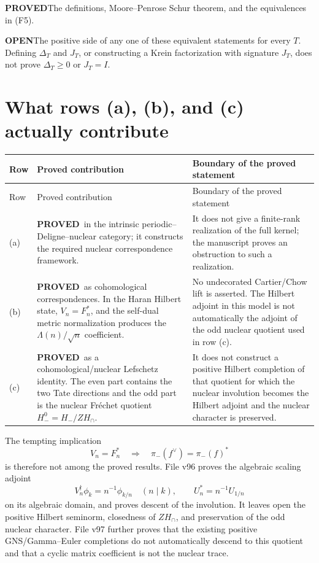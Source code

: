 \documentclass[11pt]{article}
\newcommand{\PROVED}{\textcolor{green!45!black}{\textbf{PROVED}}}
\newcommand{\OPEN}{\textcolor{red!70!black}{\textbf{OPEN}}}
\begin{document}
\medskip
\noindent\PROVED\quad The definitions, Moore--Penrose Schur theorem, and the
equivalences in (F5).

\noindent\OPEN\quad The positive side of any one of these equivalent statements
for every \(T\).  Defining \(\Delta_T\) and \(J_T\), or constructing a Krein
factorization with signature \(J_T\), does not prove \(\Delta_T\geq0\) or
\(J_T=I\).

\section{What rows (a), (b), and (c) actually contribute}

\begin{longtable}{>{\raggedright\arraybackslash}p{}
                  >{\raggedright\arraybackslash}p{}
                  >{\raggedright\arraybackslash}p{}}
\toprule
Row & Proved contribution & Boundary of the proved statement \\
\midrule
\endfirsthead
\toprule
Row & Proved contribution & Boundary of the proved statement \\
\midrule
\endhead
(a) & \PROVED\ in the intrinsic periodic--Deligne--nuclear category; it constructs
the required nuclear correspondence framework. & It does not give a finite-rank
realization of the full kernel; the manuscript proves an obstruction to such a
realization. \\
\addlinespace
(b) & \PROVED\ as cohomological correspondences.  In the Haran Hilbert state,
\(V_n=F_n^*\), and the self-dual metric normalization produces the
\(\Lambda(n)/\sqrt n\) coefficient. & No undecorated Cartier/Chow lift is
asserted.  The Hilbert adjoint in this model is not automatically the adjoint of
the odd nuclear quotient used in row (c). \\
\addlinespace
(c) & \PROVED\ as a cohomological/nuclear Lefschetz identity.  The even part
contains the two Tate directions and the odd part is the nuclear Fr\'echet
quotient \(H_-^0=H_-/ZH_{\cap}\). & It does not construct a positive Hilbert
completion of that quotient for which the nuclear involution becomes the Hilbert
adjoint and the nuclear character is preserved. \\
\bottomrule
\end{longtable}

The tempting implication
\begin{equation}
 V_n=F_n^*
 \quad\Longrightarrow\quad
 \pi_-(f^\vee)=\pi_-(f)^*
 \tag{A1}
\end{equation}
is therefore not among the proved results.  File v96 proves the algebraic scaling
adjoint
\[
 V_n^\dagger\phi_k=n^{-1}\phi_{k/n}
 \quad(n\mid k),
 \qquad U_n^*=n^{-1}U_{1/n}
\]
on its algebraic domain, and proves descent of the involution.  It leaves open the
positive Hilbert seminorm, closedness of \(ZH_{\cap}\), and preservation of the odd
nuclear character.  File v97 further proves that the existing positive
GNS/Gamma--Euler completions do not automatically descend to this quotient and
that a cyclic matrix coefficient is not the nuclear trace.
\end{document}
